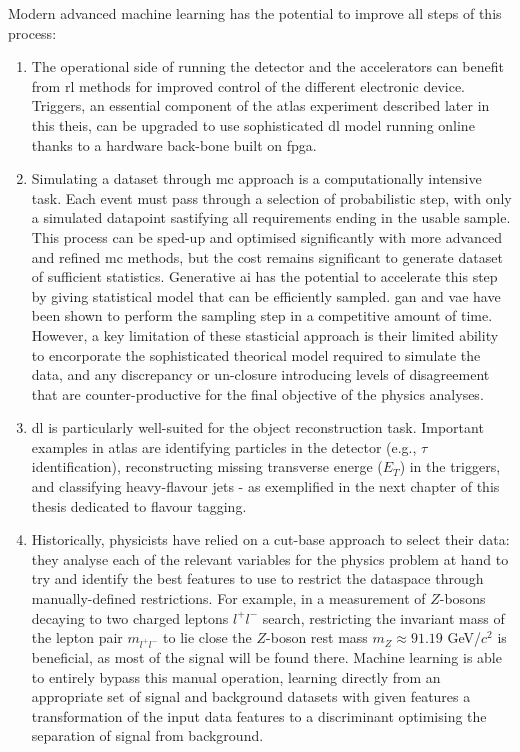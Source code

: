 Modern advanced machine learning has the potential to improve all steps of this process:
\begin{enumerate}
    \item The operational side of running the detector and the accelerators can benefit from \gls{rl} methods for improved control of the different electronic device. Triggers, an essential component of the \gls{atlas} experiment described later in this theis, can be upgraded to use sophisticated \gls{dl} model running online thanks to a hardware back-bone built on \gls{fpga}.
    \item Simulating a dataset through \gls{mc} approach is a computationally intensive task. Each event must pass through a selection of probabilistic step, with only a simulated datapoint sastifying all requirements ending in the usable sample. This process can be sped-up and optimised significantly with more advanced and refined \gls{mc} methods, but the cost remains significant to generate dataset of sufficient statistics. Generative \gls{ai} has the potential to accelerate this step by giving statistical model that can be efficiently sampled. \gls{gan} and \gls{vae} have been shown to perform the sampling step in a competitive amount of time. However, a key limitation of these stasticial approach is their limited ability to encorporate the sophisticated theorical model required to simulate the data, and any discrepancy or un-closure introducing levels of disagreement that are counter-productive for the final objective of the physics analyses.
    \item \gls{dl} is particularly well-suited for the object reconstruction task. Important examples in \gls{atlas} are identifying particles in the detector (e.g., $\tau$ identification), reconstructing missing transverse energe ($E_T$) in the triggers, and classifying heavy-flavour jets - as exemplified in the next chapter of this thesis dedicated to flavour tagging. %
    \item Historically, physicists have relied on a cut-base approach to select their data: they analyse each of the relevant variables for the physics problem at hand to try and identify the best features to use to restrict the dataspace through manually-defined restrictions. For example, in a measurement of $Z$-bosons decaying to two charged leptons $l^+l^-$ search, restricting the invariant mass of the lepton pair $m_{l^+l^-}$ to lie close the $Z$-boson rest mass $m_Z \approx 91.19$ GeV/$c^2$ is beneficial, as most of the signal will be found there. Machine learning is able to entirely bypass this manual operation, learning directly from an appropriate set of signal and background datasets with given features a transformation of the input data features to a discriminant optimising the separation of signal from background. 

\end{enumerate}
